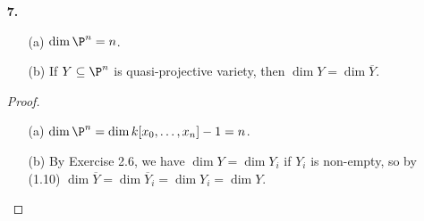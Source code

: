 \documentclass[a4paper]{article}
\begin{document}
\begin{enumerate} [label=\textbf{\arabic*.}, leftmargin=0cm]
          \begin{proof}
              Let $\varphi_i : U_i \to \A^n$ be the homeomoprhism of (2.2),  let $Y_i$ be the affine variety $\varphi_i(Y \cap U_i)$, and let $A(Y_i)$ be its affine coordinate ring. If $g(y_1, \dots, y_n)$ is an element of $A(Y_i)$, then define the map $A(Y_i) \rightarrow S(Y)_{x_i}$ as $g(x_0 / x_i, \dots, x_n / x_i)$, or equivalently $g \mapsto \varphi_i^* g = g \circ \varphi_i$; thus we can identify $A(Y_i)$ with the subring of elements of degree $0$ of the localized ring $S(Y)_{x_i}$. Then, $S(Y)_{x_i} \simeq A(Y_i)[x_i, x_i^{-1}]$ since every monomial in $k[x_0, \dots, x_n]$ can be written as
              \begin{equation*}
                  x_0^{d_0} \cdots x_i^{d_i} \cdots x_n^{d_n} = \frac{x_0^{d_0} \cdots \widehat{x_i^{d_i}} \cdots x_n^{d_n}}{x_i^{d_0 + \cdots + \widehat{d_i} + \cdots + d_n}} x_i^{d_0 + \cdots + d_n},
              \end{equation*}
              where $~\widehat{}~$ denotes omission, and the quotient is in the image of $A(Y_i) \to S(Y)_{x_i}$. By (1.8A), the dimension of $S(Y)$ is equal to the transcendence degree of the quotient field of $S(Y)$, which is isomorphic to the quotient field of $S(Y)_{x_i}$. The dimension of $A(Y_i)$ is equal to the dimension to $Y_i$ by (1.7). Therefore, we have
              \begin{align*}
                  \dim{S(Y)} & = \dim{S(Y)_{x_i}}            \\
                             & = \dim{A(Y_i)[x_i, x_i^{-1}]} \\
                             & = \dim{A(Y_i)} + 1            \\
                             & = \dim{Y_i} + 1.
              \end{align*}
              Since the $Y_i$ cover $Y$, $\dim{Y} = \sup{\dim{Y_i}}$, so $\dim{S(Y)} = \dim{Y} + 1$ By (I, Ex. 1.10).
          \end{proof}

    \item[\textbf{7.}] \begin{itemize}
              \item[(a)] $\dim{\P^n} = n$.
              \item[(b)] If $Y \subseteq \P^n$ is quasi-projective variety, then $\dim{Y} = \dim{\overline{Y}}$.
          \end{itemize}

          \begin{proof} $ $ \vspace{0pt}
              \begin{itemize}
                  \item[(a)] $\dim{\P^n} = \dim{k[x_0, \dots, x_n]} - 1 = n$.
                  \item[(b)] By Exercise 2.6, we have $\dim{Y} = \dim{Y_i}$ if $Y_i$ is non-empty, so by (1.10) $\dim{\overline{Y}} = \dim{\overline{Y}_i} = \dim{Y_i} = \dim{Y}$.
              \end{itemize}
          \end{proof}


\end{enumerate}
\end{document}
